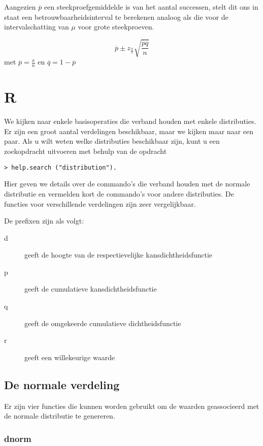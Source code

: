 Aangezien $\overline{p}$ een steekproefgemiddelde is van het aantal successen, stelt dit ons in staat een betrouwbaarheidsinterval te berekenen analoog als die voor de intervalschatting van $\mu$ voor grote steekproeven.

\begin{definition}
  \[ \overline{p} \pm z_{\frac{\alpha}{2}} \sqrt{\frac{\overline{p}\overline{q}}{n}} \]
  met $\overline{p} = \frac{x}{n}$ en $\overline{q} = 1- \overline{p}$
\end{definition}


\section{R}
We kijken naar enkele basisoperaties die verband houden met enkele distributies. Er zijn een groot aantal verdelingen beschikbaar, maar we kijken maar naar een paar. Als u wilt weten welke distributies beschikbaar zijn, kunt u een zoekopdracht uitvoeren met behulp van de opdracht

\begin{lstlisting}
> help.search ("distribution").
\end{lstlisting}


Hier geven we details over de commando's die verband houden met de normale distributie en vermelden kort de commando's voor andere distributies. De functies voor verschillende verdelingen zijn zeer vergelijkbaar.

De prefixen zijn als volgt:
\begin{description}
	\item[d] geeft de hoogte van de respectievelijke kansdichtheidsfunctie
	\item[p] geeft de cumulatieve kansdichtheidsfunctie
	\item[q] geeft de omgekeerde cumulatieve dichtheidsfunctie
	\item[r] geeft een willekeurige waarde
\end{description}

\subsection{De normale verdeling}
Er zijn vier functies die kunnen worden gebruikt om de waarden geassocieerd met de normale distributie te genereren.
\subsubsection{dnorm}

